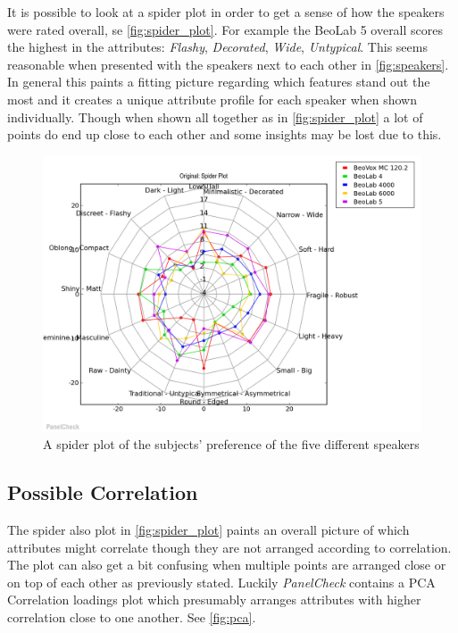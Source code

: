 It is possible to look at a spider plot in order to get a sense of how the speakers were rated overall, se \autoref{fig:spider_plot}. For example the BeoLab 5 overall scores the highest in the attributes: \textit{Flashy}, \textit{Decorated}, \textit{Wide}, \textit{Untypical}. This seems reasonable when presented with the speakers next to each other in \autoref{fig:speakers}. In general this paints a fitting picture regarding which features stand out the most and it creates a unique attribute profile for each speaker when shown individually. Though when shown all together as in \autoref{fig:spider_plot} a lot of points do end up close to each other and some insights may be lost due to this.

\begin{figure}[H]
\centering
\includegraphics[width = \textwidth]{Figure/spider_plot.png}
\caption{A spider plot of the subjects' preference of the five different speakers}
\label{fig:spider_plot}
\end{figure}

\subsection*{Possible Correlation}
The spider also plot in \autoref{fig:spider_plot} paints an overall picture of which attributes might correlate though they are not arranged according to correlation. The plot can also get a bit confusing when multiple points are arranged close or on top of each other as previously stated. Luckily \textit{PanelCheck} contains a PCA Correlation loadings plot which presumably arranges attributes with higher correlation close to one another. See \autoref{fig:pca}.


